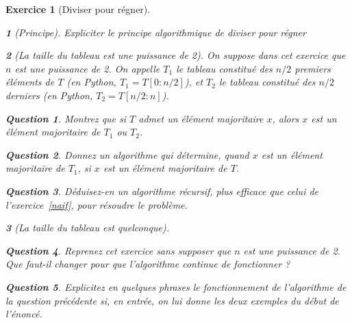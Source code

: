 \documentclass{article}
\theoremstyle{exostyle}
\newtheorem{exo}{Exercice}
\theoremstyle{partiestyle}
\newtheorem{partie}{}[exo]
\theoremstyle{questionstyle}
\newtheorem{questionpartie}{Question}[partie]
\begin{document}
\begin{exo}[Diviser pour régner]

\begin{partie}[Principe]

    Expliciter le principe algorithmique de {\it diviser pour régner}

\end{partie}
\begin{partie}[La taille du tableau est une puissance de 2]
    On suppose dans cet exercice que $n$ est une puissance de 2. On appelle $T_1$ le tableau constitué des $n/2$ premiers éléments de $T$ (en Python, $T_1 = T[0:n/2]$), et $T_2$ le tableau constitué des $n/2$ derniers (en Python, $T_2 = T[n/2 : n]$).
\begin{questionpartie}
Montrez que si $T$ admet un élément majoritaire $x$, alors $x$ est un élément majoritaire de $T_1$ ou $T_2$.
\end{questionpartie}
\begin{questionpartie}
    Donnez un algorithme qui détermine, quand $x$ est un élément majoritaire de $T_1$, si $x$ est un élément majoritaire de $T$.
\end{questionpartie}
\begin{questionpartie}
    Déduisez-en un algorithme récursif, plus efficace que celui de l'exercice~\ref{naif}, pour résoudre le problème.
\end{questionpartie}
\end{partie}
\begin{partie}[La taille du tableau est quelconque]
    \begin{questionpartie}
        Reprenez cet exercice sans supposer que $n$ est une puissance de 2. Que faut-il changer pour que l'algorithme continue de fonctionner ?
    \end{questionpartie} 
    \begin{questionpartie}
        Explicitez en quelques phrases le fonctionnement de l'algorithme de la question précédente si, en entrée, on lui donne les deux exemples du début de l'énoncé.
    \end{questionpartie}     
\end{partie}
\end{exo}
\end{document}
